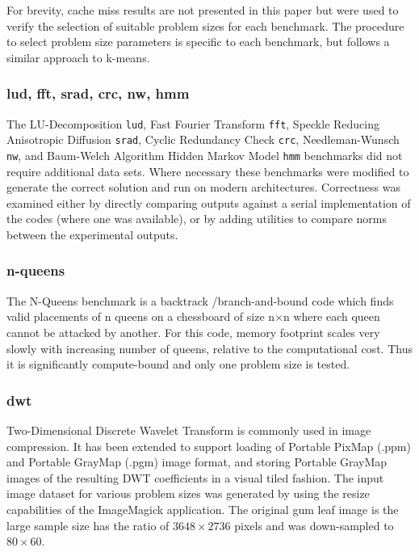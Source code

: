 \documentclass[../document.tex]{subfiles}
\begin{document}
For brevity, cache miss results are not presented in this paper but were used to verify the selection of suitable problem sizes for each benchmark.
The procedure to select problem size parameters is specific to each benchmark, but follows a similar approach to k-means.

\subsubsection{lud, fft, srad, crc, nw, hmm}
The LU-Decomposition {\tt lud}, Fast Fourier Transform {\tt fft}, Speckle Reducing Anisotropic Diffusion {\tt srad}, Cyclic Redundancy Check {\tt crc}, Needleman-Wunsch {\tt nw}, and Baum-Welch Algorithm Hidden Markov Model {\tt hmm} benchmarks did not require additional data sets.
Where necessary these benchmarks were modified to generate the correct solution and run on modern architectures.
Correctness was examined either by directly comparing outputs against a serial implementation of the codes (where one was available), or by adding utilities to compare norms between the experimental outputs.

\subsubsection{n-queens}
The N-Queens benchmark is a backtrack /branch-and-bound code which finds valid placements of n queens on a chessboard of size n$\times$n where each queen cannot be attacked by another.
For this code, memory footprint scales very slowly with increasing number of queens, relative to the computational cost.
Thus it is significantly compute-bound and only one problem size is tested.

\subsubsection{dwt}
Two-Dimensional Discrete Wavelet Transform is commonly used in image compression.
It has been extended to support loading of Portable PixMap (.ppm) and Portable GrayMap (.pgm) image format, and storing Portable GrayMap images of the resulting DWT coefficients in a visual tiled fashion.
The input image dataset for various problem sizes was generated by using the resize capabilities of the ImageMagick application.
The original gum leaf image is the large sample size has the ratio of $3648 \times 2736$ pixels and was down-sampled to  $80 \times 60$.
\end{document}
